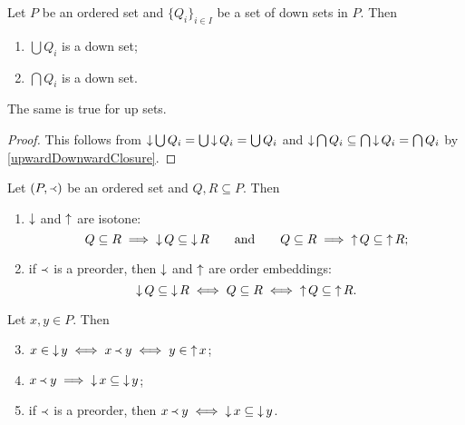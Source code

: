 \begin{corollary} \label{unionIntersectionDownUpSets}
Let $P$ be an ordered set and $\{Q_i\}_{i\in I}$ be a set of down sets in $P$. Then
\begin{enumerate}
\item $\bigcup Q_i$ is a down set;
\item $\bigcap Q_i$ is a down set.
\end{enumerate}
The same is true for up sets.
\end{corollary}
\begin{proof}
This follows from $\mathop{\downarrow} \bigcup Q_i = \bigcup \mathop{\downarrow} Q_i = \bigcup Q_i$ and $\mathop{\downarrow} \bigcap Q_i \subseteq \bigcap \mathop{\downarrow} Q_i = \bigcap Q_i$ by \ref{upwardDownwardClosure}.
\end{proof}


\begin{lemma} \label{upDownsetInclusion}
Let $\left( P,\Yleft \right)$ be an ordered set and $Q,R\subseteq P$. Then
\begin{enumerate}
\item $\mathop{\downarrow}$ and $\mathop{\uparrow}$ are isotone:
\[Q \subseteq R \implies \mathop{\downarrow} Q \subseteq \mathop{\downarrow} R\qquad\text{and}\qquad Q \subseteq R \implies \mathop{\uparrow} Q \subseteq \mathop{\uparrow} R; \]
\item if $\Yleft$ is a preorder, then $\mathop{\downarrow}$ and $\mathop{\uparrow}$ are order embeddings:
\[ \mathop{\downarrow} Q \subseteq \mathop{\downarrow} R \iff Q \subseteq R \iff \mathop{\uparrow} Q \subseteq \mathop{\uparrow} R. \]
\end{enumerate}
Let $x, y \in P$. Then
\begin{enumerate} \setcounter{enumi}{2}
\item $x\in \mathop{\downarrow} y \iff x\Yleft y \iff y \in \mathop{\uparrow} x$;
\item $x\Yleft y \implies \mathop{\downarrow} x \subseteq \mathop{\downarrow} y$;
\item if $\Yleft$ is a preorder, then $x\Yleft y \iff \mathop{\downarrow} x \subseteq \mathop{\downarrow} y$.
\end{enumerate}
\end{lemma}


